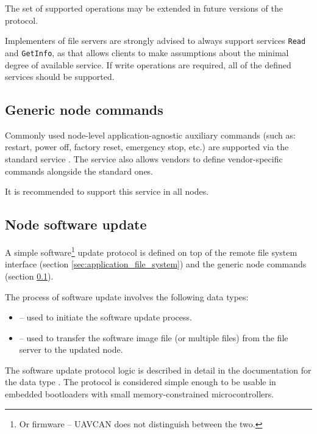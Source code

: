 The set of supported operations may be extended in future versions of the protocol.

Implementers of file servers are strongly advised to always support services \verb|Read| and \verb|GetInfo|,
as that allows clients to make assumptions about the minimal degree of available service.
If write operations are required, all of the defined services should be supported.


\subsection{Generic node commands}\label{sec:application_generic_node_commands}

Commonly used node-level application-agnostic auxiliary commands
(such as: restart, power off, factory reset, emergency stop, etc.)
are supported via the standard service .
The service also allows vendors to define vendor-specific commands alongside the standard ones.

It is recommended to support this service in all nodes.

\subsection{Node software update}

A simple software\footnote{Or firmware -- UAVCAN does not distinguish between the two.}
update protocol is defined on top of the remote file system interface (section \ref{sec:application_file_system})
and the generic node commands (section \ref{sec:application_generic_node_commands}).

The process of software update involves the following data types:

\begin{itemize}
    \item {} -- used to initiate the software update process.
    \item {} -- used to transfer the software image file (or multiple files)
          from the file server to the updated node.
\end{itemize}

The software update protocol logic is described in detail in the documentation for the data type
.
The protocol is considered simple enough to be usable in embedded bootloaders with
small memory-constrained microcontrollers.

